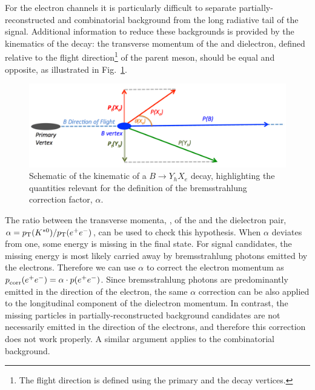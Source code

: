 For the electron channels it is particularly difficult to separate partially-reconstructed and combinatorial background from the 
long radiative tail of the signal. Additional information to reduce these backgrounds is provided by the kinematics of the decay: 
the transverse momentum of the \Kstarz and dielectron, defined relative to the flight direction\footnote{The flight direction is defined 
using the primary and the decay vertices.} of the parent \Bz meson, should be equal and opposite, as illustrated in Fig.~\ref{fig:schemaHOP}.
\begin{figure}[b]
 \centering
    \includegraphics[width=0.9\linewidth]{RKst/figs/HOP/schemaHOP.pdf}
  \caption{ Schematic of the kinematic of a $B \to Y_h X_e$ decay, highlighting the quantities relevant for the 
  definition of the bremsstrahlung correction factor, $\alpha$.}
  \label{fig:schemaHOP}
\end{figure}

The ratio between the transverse momenta, \pt, of the \Kstarz and the dielectron pair, $\alpha = \mbox{$p_{\rm T}$}({{K}^{*0}}) / \mbox{$p_{\rm T}$}(e^+ e^-)$, can be used 
to check this hypothesis. When $\alpha$ deviates from one, some energy is missing in the final state. 
For signal candidates, the missing energy is most likely carried away by bremsstrahlung photons emitted
by the electrons. Therefore we can use $\alpha$ to correct the electron momentum as $\mbox{$p$}_{\textrm{corr}}(e^+ e^-) = \alpha \cdot \mbox{$p$}(e^+ e^-)$.
Since bremsstrahlung photons are predominantly emitted in the direction of the electron, the same $\alpha$ correction can
be also applied to the longitudinal component of the dielectron momentum.
In contrast, the missing particles in partially-reconstructed background candidates are not necessarily emitted in the
direction of the electrons, and therefore this correction does not work properly.
A similar argument applies to the combinatorial background. 

